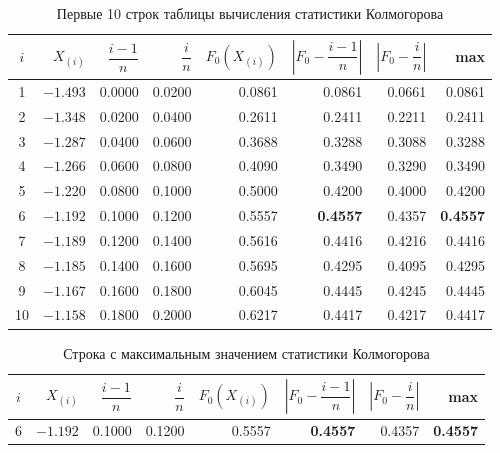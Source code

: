 \documentclass[a4paper,final]{article}
\begin{document}
\begin{table}[H]
\centering
\caption{Первые 10 строк таблицы вычисления статистики Колмогорова}
\begin{tabular}{|c|r|r|r|r|r|r|r|}
\hline
$i$ & $X_{(i)}$ & $\dfrac{i-1}{n}$ & $\dfrac{i}{n}$ & $F_0(X_{(i)})$ &
$\left|F_0 - \dfrac{i-1}{n}\right|$ & $\left|F_0 - \dfrac{i}{n}\right|$ & max\\
\hline
1  & $-1.493$ & 0.0000 & 0.0200 & 0.0861 & 0.0861 & 0.0661 & 0.0861\\
2  & $-1.348$ & 0.0200 & 0.0400 & 0.2611 & 0.2411 & 0.2211 & 0.2411\\
3  & $-1.287$ & 0.0400 & 0.0600 & 0.3688 & 0.3288 & 0.3088 & 0.3288\\
4  & $-1.266$ & 0.0600 & 0.0800 & 0.4090 & 0.3490 & 0.3290 & 0.3490\\
5  & $-1.220$ & 0.0800 & 0.1000 & 0.5000 & 0.4200 & 0.4000 & 0.4200\\
6  & $-1.192$ & 0.1000 & 0.1200 & 0.5557 & \textbf{0.4557} & 0.4357 & \textbf{0.4557}\\
7  & $-1.189$ & 0.1200 & 0.1400 & 0.5616 & 0.4416 & 0.4216 & 0.4416\\
8  & $-1.185$ & 0.1400 & 0.1600 & 0.5695 & 0.4295 & 0.4095 & 0.4295\\
9  & $-1.167$ & 0.1600 & 0.1800 & 0.6045 & 0.4445 & 0.4245 & 0.4445\\
10 & $-1.158$ & 0.1800 & 0.2000 & 0.6217 & 0.4417 & 0.4217 & 0.4417\\
\hline
\end{tabular}
\end{table}

\begin{table}[H]
\centering
\caption{Строка с максимальным значением статистики Колмогорова}
\begin{tabular}{|c|r|r|r|r|r|r|r|}
\hline
$i$ & $X_{(i)}$ & $\dfrac{i-1}{n}$ & $\dfrac{i}{n}$ & $F_0(X_{(i)})$ &
$\left|F_0 - \dfrac{i-1}{n}\right|$ & $\left|F_0 - \dfrac{i}{n}\right|$ & max\\
\hline
6 & $-1.192$ & 0.1000 & 0.1200 & 0.5557 & \textbf{0.4557} & 0.4357 & \textbf{0.4557}\\
\hline
\end{tabular}
\end{table}
\end{document}

